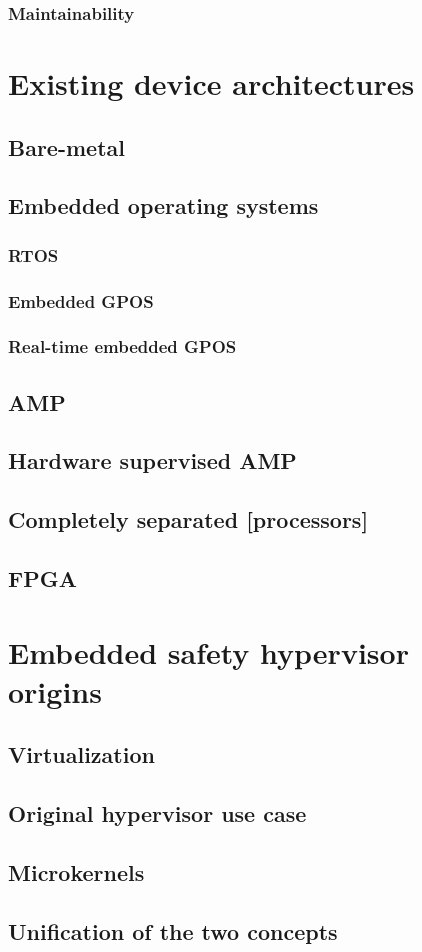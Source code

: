 \subsubsection{Maintainability}


\section{Existing device architectures}
\subsection{Bare-metal}
\subsection{Embedded operating systems}
\subsubsection{RTOS}
\subsubsection{Embedded GPOS}
\subsubsection{Real-time embedded GPOS}
\subsection{AMP}
\subsection{Hardware supervised AMP}
\subsection{Completely separated [processors]}
\subsection{FPGA}


\section{Embedded safety hypervisor origins}
\subsection{Virtualization}
\subsection{Original hypervisor use case}
\subsection{Microkernels}
\subsection{Unification of the two concepts}



